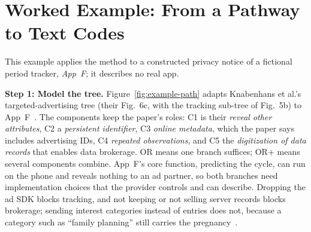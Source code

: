 \chapter{Worked Example: From a Pathway to Text Codes}
\label{app:example}

This example applies the method to a constructed privacy notice of a
fictional period tracker, \emph{App~F}; it describes no real app.

\textbf{Step 1: Model the tree.} Figure~\ref{fig:example-path} adapts
Knabenhans et al.'s targeted-advertising tree (their Fig.~6c, with the
tracking sub-tree of Fig.~5b) to App~F~\parencite[\S4.2]{knabenhans2026harms}.
The components keep the paper's roles: C1 is their \emph{reveal other
attributes}, C2 a \emph{persistent identifier}, C3 \emph{online metadata},
which the paper says includes advertising IDs, C4 \emph{repeated
observations}, and C5 the \emph{digitization of data records} that enables
data brokerage. OR means one branch suffices; OR+ means several components
combine. App~F's core function, predicting the cycle, can run on the phone and
reveals nothing to an ad partner, so both branches need implementation
choices that the provider controls and can describe. Dropping the ad SDK
blocks tracking, and not keeping or not selling server records blocks
brokerage; sending interest categories instead of entries does not, because a
category such as \enquote{family planning} still carries the
pregnancy~\parencite{martin2025cookies}.

